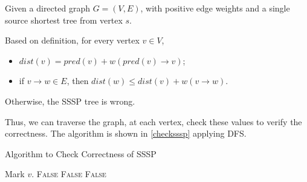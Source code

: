 \documentclass[12pt,letterpaper,titlepage,en-US]{article}
\begin{document}
\begin{homeworkProblem}[SSSP]
Given a directed graph $G = (V,E)$, with positive edge weights and a single source shortest tree from vertex $s$.

Based on definition, for every vertex $v \in V$,
\begin{itemize}
    \item $dist(v) = pred(v) + w(pred(v) \rightarrow v)$;
    \item if $v \rightarrow w \in E$,
        then $dist(w) \leq dist(v) + w(v \rightarrow w)$.
\end{itemize}

Otherwise, the SSSP tree is wrong.

Thus, we can traverse the graph, at each vertex, check these values to verify the correctness.
The algorithm is shown in \cref{checksssp} applying DFS.

\begin{algorithm}[H]
    \caption{Algorithm to Check Correctness of SSSP}\label{checksssp}
    \begin{algorithmic}[1]
            \State Mark $v$.
                    \Return \textsc{False}
                \EndIf
                    \Return \textsc{False}
                        \Return \textsc{False}
                    \EndIf
                \EndIf
                    \Return{}
                \EndIf
            \EndFor
        \EndProcedure
    \end{algorithmic}
\end{algorithm}

\end{homeworkProblem}
\end{document}
